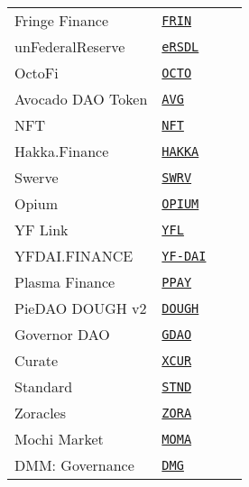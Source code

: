 \begin{tabular}{llll}
Fringe Finance & \href{https://etherscan.io/address/0xC9fE6E1C76210bE83DC1B5b20ec7FD010B0b1D15}{\tt FRIN} \\
unFederalReserve & \href{https://etherscan.io/address/0x5218E472cFCFE0b64A064F055B43b4cdC9EfD3A6}{\tt eRSDL} \\
OctoFi & \href{https://etherscan.io/address/0x7240aC91f01233BaAf8b064248E80feaA5912BA3}{\tt OCTO} \\
Avocado DAO Token & \href{https://etherscan.io/address/0xa41f142b6eb2b164f8164cae0716892ce02f311f}{\tt AVG} \\
NFT & \href{https://etherscan.io/address/0xcB8d1260F9c92A3A545d409466280fFdD7AF7042}{\tt NFT} \\
Hakka.Finance & \href{https://etherscan.io/address/0x0e29e5abbb5fd88e28b2d355774e73bd47de3bcd}{\tt HAKKA} \\
Swerve & \href{https://etherscan.io/address/0xb8baa0e4287890a5f79863ab62b7f175cecbd433}{\tt SWRV} \\
Opium & \href{https://etherscan.io/address/0x888888888889c00c67689029d7856aac1065ec11}{\tt OPIUM} \\
YF Link & \href{https://etherscan.io/address/0x28cb7e841ee97947a86B06fA4090C8451f64c0be}{\tt YFL} \\
YFDAI.FINANCE & \href{https://etherscan.io/address/0xf4CD3d3Fda8d7Fd6C5a500203e38640A70Bf9577}{\tt YF-DAI} \\
Plasma Finance & \href{https://etherscan.io/address/0x054d64b73d3d8a21af3d764efd76bcaa774f3bb2}{\tt PPAY} \\
PieDAO DOUGH v2 & \href{https://etherscan.io/address/0xad32A8e6220741182940c5aBF610bDE99E737b2D}{\tt DOUGH} \\
Governor DAO & \href{https://etherscan.io/address/0x515d7e9d75e2b76db60f8a051cd890eba23286bc}{\tt GDAO} \\
Curate & \href{https://etherscan.io/address/0xE1c7E30C42C24582888C758984f6e382096786bd}{\tt XCUR} \\
Standard & \href{https://etherscan.io/address/0x9040e237C3bF18347bb00957Dc22167D0f2b999d}{\tt STND} \\
Zoracles & \href{https://etherscan.io/address/0xD8E3FB3b08eBA982F2754988d70D57eDc0055ae6}{\tt ZORA} \\
Mochi Market & \href{https://etherscan.io/address/0xbd1848e1491d4308ad18287a745dd4db2a4bd55b}{\tt MOMA} \\
DMM: Governance & \href{https://etherscan.io/address/0xEd91879919B71bB6905f23af0A68d231EcF87b14}{\tt DMG} \\

\end{tabular}
